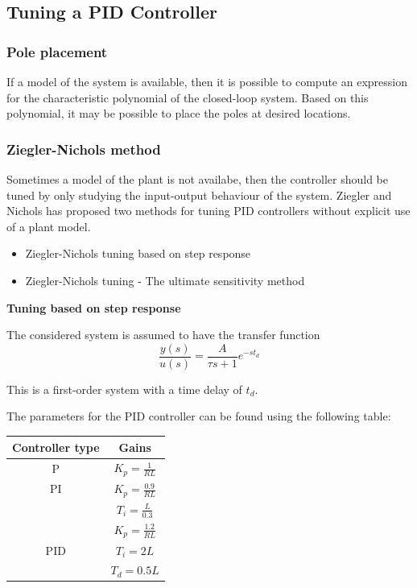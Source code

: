 \subsection{Tuning a PID Controller}
\subsubsection{Pole placement}

If a model of the system is available, then it is possible to compute an expression
for the characteristic polynomial of the closed-loop system. Based on this polynomial,
it may be possible to place the poles at desired locations.

\subsubsection{Ziegler-Nichols method}

Sometimes a model of the plant is not availabe, then the controller should be tuned
by only studying the input-output behaviour of the system.
Ziegler and Nichols has proposed two methods for tuning PID controllers without
explicit use of a plant model.

\begin{itemize}
	\item{Ziegler-Nichols tuning based on step response}
	\item{Ziegler-Nichols tuning - The ultimate sensitivity method}
\end{itemize}


\textbf{Tuning based on step response}

The considered system is assumed to have the transfer function
$$\frac{y(s)}{u(s)} = \frac{A}{\tau s + 1} e^{-st_d}$$

This is a first-order system with a time delay of $t_d$.

The parameters for the PID controller can be found using the following table:
\begin{table}[h]
\centering
\begin{tabular}{|c|c|}
\hline
\cellcolor[HTML]{C0C0C0} \textbf{Controller type}& \cellcolor[HTML]{C0C0C0}\textbf{Gains}  \\ \hline
P&$K_p=\frac{1}{RL}$ \\ \hline
PI&$K_p=\frac{0.9}{RL}$\\
  &$T_i=\frac{L}{0.3}$\\ \hline
& $K_p=\frac{1.2}{RL}$ \\
 PID &$T_i=2L$ \\
  &$T_d=0.5L$\\ \hline
\end{tabular}
\end{table}


